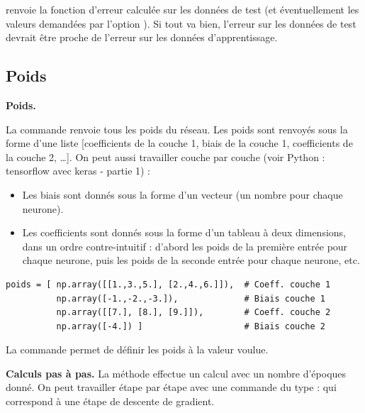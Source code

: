 \documentclass[11pt,class=report,crop=false]{standalone}
\begin{document}
renvoie la fonction d'erreur calculée sur les données de test (et éventuellement les valeurs demandées par l'option ).
Si tout va bien, l'erreur sur les données de test devrait être proche de l'erreur sur les données d'apprentissage.




\subsection{Poids}


\textbf{Poids.}

La commande  renvoie tous les poids du réseau.
Les poids sont renvoyés sous la forme d'une liste [coefficients de la couche 1, biais de la couche 1, coefficients de la couche 2, \ldots].
On peut aussi travailler couche par couche (voir \og{}Python : tensorflow avec keras - partie 1\fg{}) : 

\begin{itemize}
  \item Les biais sont donnés sous la forme d'un vecteur (un nombre pour chaque neurone).
  \item Les coefficients sont donnés sous la forme d'un tableau à deux dimensions, dans un ordre contre-intuitif : d'abord les poids de la première entrée pour chaque neurone, puis les poids de la seconde entrée pour chaque neurone, etc.
\end{itemize}

\begin{lstlisting}
poids = [ np.array([[1.,3.,5.], [2.,4.,6.]]),  # Coeff. couche 1
          np.array([-1.,-2.,-3.]),             # Biais couche 1                
          np.array([[7.], [8.], [9.]]),        # Coeff. couche 2
          np.array([-4.]) ]                    # Biais couche 2
\end{lstlisting}


La commande  permet de définir les poids à la valeur voulue.
  
\bigskip
\textbf{Calculs pas à pas.}
La méthode  effectue un calcul avec un nombre d'époques donné.
On peut travailler étape par étape avec une commande du type :
qui correspond à une étape de descente de gradient.
\end{document}
